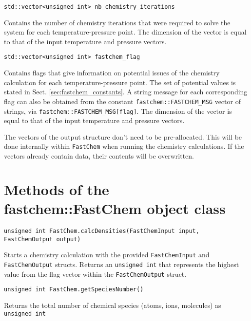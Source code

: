 \documentclass[numbers=noenddot]{fcmanual}
\newcommand{\fc}{\texttt{FastChem}\xspace}
\begin{document}
\bigbreak

\lstinline!std::vector<unsigned int> nb_chemistry_iterations!
\begin{addmargin}[25pt]{0pt}
  Contains the number of chemistry iterations that were required to solve the system for each temperature-pressure point. The dimension of the vector is equal to that of the input temperature and pressure vectors.
\end{addmargin}

\bigbreak

\lstinline!std::vector<unsigned int> fastchem_flag!
\begin{addmargin}[25pt]{0pt}
  Contains flags that give information on potential issues of the chemistry calculation for each temperature-pressure point. The set of potential values is stated in Sect. \ref{sec:fastchem_constants}. A string message for each corresponding flag can also be obtained from the constant \lstinline!fastchem::FASTCHEM_MSG! vector of strings, via \lstinline!fastchem::FASTCHEM_MSG[flag]!. The dimension of the vector is equal to that of the input temperature and pressure vectors.
\end{addmargin}

\bigbreak

The vectors of the output structure don't need to be pre-allocated. This will be done internally within \fc when running the chemistry calculations. If the vectors already contain data, their contents will be overwritten.


\section{Methods of the fastchem::FastChem object class}
\label{sec:fastchem_methods}

\lstinline!unsigned int FastChem.calcDensities(FastChemInput input, FastChemOutput output)!
\begin{addmargin}[25pt]{0pt}
  Starts a chemistry calculation with the provided \lstinline!FastChemInput! and \lstinline!FastChemOutput! structs. Returns an \lstinline!unsigned int! that represents the highest value from the flag vector within the \lstinline!FastChemOutput! struct.
\end{addmargin}

\bigbreak

\lstinline!unsigned int FastChem.getSpeciesNumber()!
  \begin{addmargin}[25pt]{0pt}
    Returns the total number of chemical species (atoms, ions, molecules) as \lstinline!unsigned int!
  \end{addmargin}
  
\end{document}
